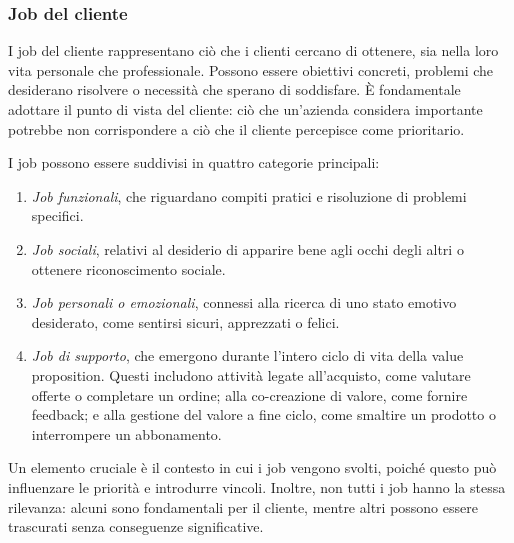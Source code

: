 \subsubsection{Job del cliente}
I job del cliente rappresentano ciò che i clienti cercano di ottenere, sia nella loro vita personale che professionale. Possono essere obiettivi concreti, problemi che desiderano risolvere o necessità che sperano di soddisfare. È fondamentale adottare il punto di vista del cliente: ciò che un'azienda considera importante potrebbe non corrispondere a ciò che il cliente percepisce come prioritario.

I job possono essere suddivisi in quattro categorie principali:
\begin{enumerate}
    \item \textit{Job funzionali}, che riguardano compiti pratici e risoluzione di problemi specifici.
    \item \textit{Job sociali}, relativi al desiderio di apparire bene agli occhi degli altri o ottenere riconoscimento sociale.
    \item \textit{Job personali o emozionali}, connessi alla ricerca di uno stato emotivo desiderato, come sentirsi sicuri, apprezzati o felici.
    \item \textit{Job di supporto}, che emergono durante l'intero ciclo di vita della value proposition. Questi includono attività legate all'acquisto, come valutare offerte o completare un ordine; alla co-creazione di valore, come fornire feedback; e alla gestione del valore a fine ciclo, come smaltire un prodotto o interrompere un abbonamento.
\end{enumerate}
Un elemento cruciale è il contesto in cui i job vengono svolti, poiché questo può influenzare le priorità e introdurre vincoli. Inoltre, non tutti i job hanno la stessa rilevanza: alcuni sono fondamentali per il cliente, mentre altri possono essere trascurati senza conseguenze significative.

